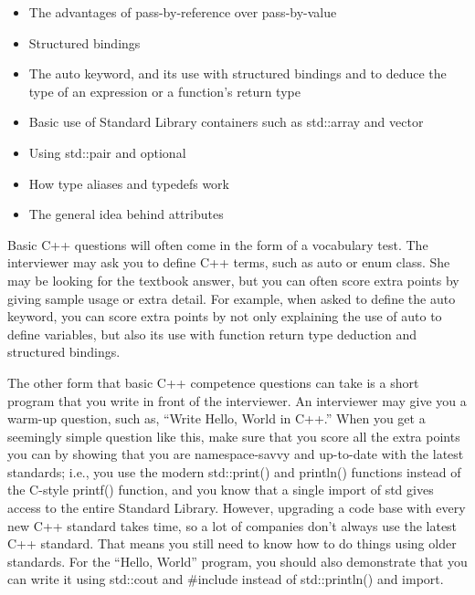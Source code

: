\begin{itemize}
\item
The advantages of pass-by-reference over pass-by-value

\item
Structured bindings

\item
The auto keyword, and its use with structured bindings and to deduce the type of an expression or a function’s return type

\item
Basic use of Standard Library containers such as std::array and vector

\item
Using std::pair and optional

\item
How type aliases and typedefs work

\item
The general idea behind attributes
\end{itemize}


Basic C++ questions will often come in the form of a vocabulary test. The interviewer may ask you to define C++ terms, such as auto or enum class. She may be looking for the textbook answer, but you can often score extra points by giving sample usage or extra detail. For example, when asked to define the auto keyword, you can score extra points by not only explaining the use of auto to define variables, but also its use with function return type deduction and structured bindings.

The other form that basic C++ competence questions can take is a short program that you write in front of the interviewer. An interviewer may give you a warm-up question, such as, “Write Hello, World in C++.” When you get a seemingly simple question like this, make sure that you score all the extra points you can by showing that you are namespace-savvy and up-to-date with the latest standards; i.e., you use the modern std::print() and println() functions instead of the C-style printf() function, and you know that a single import of std gives access to the entire Standard Library. However, upgrading a code base with every new C++ standard takes time, so a lot of companies don’t always use the latest C++ standard. That means you still need to know how to do things using older standards. For the “Hello, World” program, you should also demonstrate that you can write it using std::cout and \#include instead of std::println() and import.

